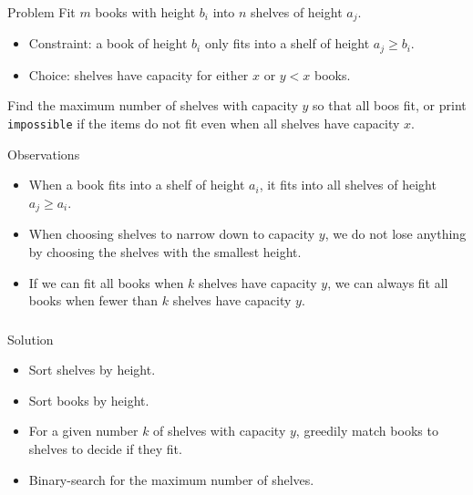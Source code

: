 \begin{frame}
    \frametitle{\problemtitle}
    \begin{block}{Problem}
        Fit $m$ books with height $b_i$ into $n$ shelves of height $a_j$.
        \begin{itemize}
            \item Constraint: a book of height $b_i$ only fits into a
                shelf of height $a_j \geq b_i$.
            \item Choice: shelves have capacity for either $x$ or $y<x$ books.
        \end{itemize}
        Find the maximum number of shelves with capacity $y$
        so that all boos fit, or print \texttt{impossible} if the items
        do not fit even when all shelves have capacity $x$.
    \end{block}
    \pause
    \begin{block}{Observations}
        \begin{itemize}
            \item When a book fits into a shelf of height $a_i$,
                it fits into all shelves of height $a_j \geq a_i$.
            \item When choosing shelves to narrow down to capacity $y$,
                we do not lose anything by choosing the shelves
                with the smallest height.
            \item If we can fit all books when $k$ shelves have capacity $y$,
                we can always fit all books when fewer than $k$ shelves
                have capacity $y$.
        \end{itemize}
    \end{block}
\end{frame}
\begin{frame}
    \frametitle{\problemtitle}
    \begin{block}{Solution}
        \begin{itemize}
            \item Sort shelves by height.
            \item Sort books by height.
            \item For a given number $k$ of shelves with capacity $y$,
               greedily match books to shelves to decide if they fit.
            \item Binary-search for the maximum number of shelves.
        \end{itemize}
    \end{block}
    \pause
    \solvestats
\end{frame}
